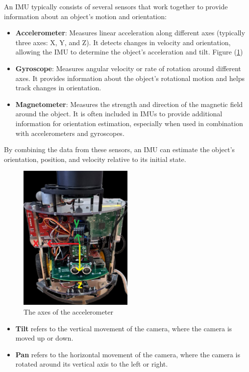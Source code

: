 \documentclass[english]{article}
\begin{document}
An IMU typically consists of several sensors that work together to
provide information about an object's motion and orientation:
\begin{itemize}
    \item \textbf{Accelerometer}: Measures linear acceleration along different axes 
    (typically three axes: X, Y, and Z). It detects changes in velocity 
    and orientation, allowing the IMU to determine the object's 
    acceleration and tilt. Figure (\ref{fig:acc})
    \item \textbf{Gyroscope}: Measures angular velocity or rate of rotation 
    around different axes. It provides information about the object's 
    rotational motion and helps track changes in orientation.
    \item \textbf{Magnetometer}: Measures the strength and direction of the
     magnetic field around the object. It is often included in IMUs to 
     provide additional information for orientation estimation,
    especially when used in combination with accelerometers and
    gyroscopes. 
\end{itemize}
By combining the data from these sensors, an IMU can estimate the
 object's orientation, position, and velocity relative to its initial 
 state. 
 \begin{figure}[!h]
     \centering
     \includegraphics[width=0.50\textwidth, height=0.4\textheight]{figures/Lab2_1.png}
     \caption{The axes of the accelerometer}
     \label{fig:acc}
 \end{figure}
 \begin{itemize}
    \item \textbf{Tilt} refers to the vertical movement 
    of the camera, where the camera is moved up or down.
    \item \textbf{Pan} refers to the horizontal movement of the 
    camera, where the camera is rotated around its vertical axis
     to the left or right. 
 \end{itemize}
\end{document}
